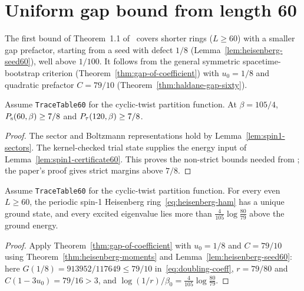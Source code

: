 \section{Uniform gap bound from length 60}

The first bound of Theorem~1.1 of~\cite{OpenAIHaldane} covers shorter rings (\(L \ge 60\)) with a
smaller gap prefactor, starting from a seed with defect \(1/8\) (Lemma~\ref{lem:heisenberg-seed60}),
well above \(1/100\). It follows from the general symmetric spacetime-bootstrap criterion
(Theorem~\ref{thm:gap-of-coefficient}) with \(u_0 = 1/8\) and quadratic prefactor \(C = 79/10\)
(Theorem~\ref{thm:haldane-gap-sixty}).

\begin{lemma}[Initial purity bounds at \(L = 60\)]
  \label{lem:heisenberg-seed60}
  \leanok
  Assume \texttt{TraceTable60} for the cyclic-twist partition function.
  At \(\beta = 105/4\), \(P_{\mathrm{s}}(60, \beta) \ge 7/8\) and \(P_{\tau}(120, \beta) \ge 7/8\).
\end{lemma}
\begin{proof}
  \leanok
  The sector and Boltzmann representations hold by Lemma~\ref{lem:spin1-sectors}.
  The kernel-checked trial state supplies the energy input of
  Lemma~\ref{lem:spin1-certificate60}. This proves the non-strict bounds needed from
  \cite[Proposition 5.4]{OpenAIHaldane}; the paper's proof gives strict margins above \(7/8\).
\end{proof}

\begin{theorem}
  \label{thm:haldane-gap-sixty}
  \leanok
  Assume \texttt{TraceTable60} for the cyclic-twist partition function.
  For every even \(L \ge 60\), the periodic spin-1 Heisenberg ring~\eqref{eq:heisenberg-ham} has a
  unique ground state, and every excited eigenvalue lies more than
  \(\tfrac{4}{105}\log\tfrac{80}{79}\) above the ground energy.
\end{theorem}
\begin{proof}
  \leanok
  Apply Theorem~\ref{thm:gap-of-coefficient} with \(u_0 = 1/8\) and \(C = 79/10\) using
  Theorem~\ref{thm:heisenberg-moments} and Lemma~\ref{lem:heisenberg-seed60}: here
  \(G(1/8) = 913952/117649 \le 79/10\) in~\eqref{eq:doubling-coeff}, \(r = 79/80\) and
  \(C(1 - 3u_0) = 79/16 > 3\), and \(\log(1/r)/\beta_0 = \tfrac{4}{105}\log\tfrac{80}{79}\).
\end{proof}

